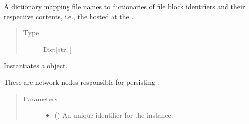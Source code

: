 \documentclass[letterpaper,10pt,english]{sphinxmanual}
\begin{document}
\begin{fulllineitems}
\begin{fulllineitems}
\begin{quote}
\begin{description}
\end{description}\end{quote}

\end{fulllineitems}


\begin{fulllineitems}
\label{\detokenize{app.domain:app.domain.network_nodes.Node.files}}
A dictionary mapping file names to dictionaries of file block
identifiers and their respective contents, i.e.,
the {\hyperref[\detokenize{app.domain.helpers:app.domain.helpers.smart_dataclasses.FileBlockData}]{}}
hosted at the .
\begin{quote}\begin{description}
\item[{Type}] \leavevmode
Dict{[}str, {\hyperref[\detokenize{app:app.type_hints.ReplicasDict}]{}}{]}

\end{description}\end{quote}

\end{fulllineitems}


\begin{fulllineitems}
\label{\detokenize{app.domain:app.domain.network_nodes.Node.__init__}}
Instantiates a  object.

These are network nodes responsible for persisting
.
\begin{quote}\begin{description}
\item[{Parameters}] \leavevmode\begin{itemize}
\item {} 
 () \textendash{} An unique identifier for the  instance.


\end{itemize}
\end{description}
\end{quote}
\end{fulllineitems}
\end{fulllineitems}
\end{document}
